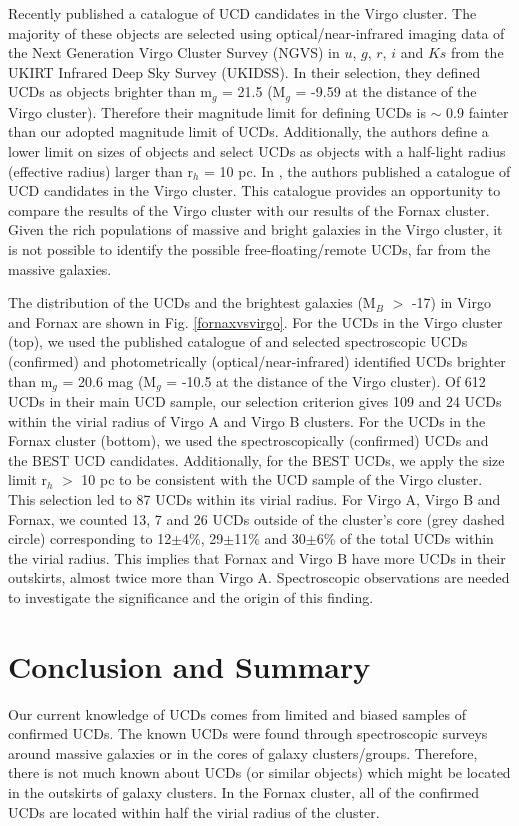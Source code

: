 \documentclass[fleqn,usenatbib]{mnras}
\begin{document}
Recently \citet{Liu-2020} published a catalogue of UCD candidates in the Virgo cluster. The majority of these objects are selected using optical/near-infrared imaging data of the Next Generation Virgo Cluster Survey (NGVS) in $u$, $g$, $r$, $i$ and $Ks$ from the UKIRT Infrared Deep Sky Survey (UKIDSS). In their selection, they defined UCDs as objects brighter than m$_g$ = 21.5 (M$_g$ = -9.59 at the distance of the Virgo cluster). Therefore their magnitude limit for defining UCDs is $\sim$ 0.9 fainter than our adopted magnitude limit of UCDs. Additionally, the authors define a lower limit on sizes of objects and select UCDs as objects with a half-light radius (effective radius) larger than r$_h$ = 10 pc. In \citet{Liu-2020}, the authors published a catalogue of UCD candidates in the Virgo cluster. This catalogue provides an opportunity to compare the results of the Virgo cluster with our results of the Fornax cluster. Given the rich populations of massive and bright galaxies in the Virgo cluster, it is not possible to identify the possible free-floating/remote UCDs, far from the massive galaxies.

The distribution of the UCDs and the brightest galaxies (M$_B$ $>$ -17) in Virgo and Fornax are shown in Fig. \ref{fornaxvsvirgo}. For the UCDs in the Virgo cluster (top), we used the published catalogue of \citet{Liu-2020} and selected spectroscopic UCDs (confirmed) and photometrically (optical/near-infrared) identified UCDs brighter than m$_g$ = 20.6 mag (M$_g$ = -10.5 at the distance of the Virgo cluster). Of 612 UCDs in their main UCD sample, our selection criterion gives 109 and 24 UCDs within the virial radius of Virgo A and Virgo B clusters. For the UCDs in the Fornax cluster (bottom), we used the spectroscopically (confirmed) UCDs and the BEST UCD candidates. Additionally, for the BEST UCDs, we apply the size limit r$_h$ $>$ 10 pc to be consistent with the UCD sample of the Virgo cluster. This selection led to 87 UCDs within its virial radius. For Virgo A, Virgo B and Fornax, we counted 13, 7 and 26 UCDs outside of the cluster's core (grey dashed circle) corresponding to 12$\pm$4\%, 29$\pm$11\% and 30$\pm$6\% of the total UCDs within the virial radius. This implies that Fornax and Virgo B have more UCDs in their outskirts, almost twice more than Virgo A. Spectroscopic observations are needed to investigate the significance and the origin of this finding.

\section{Conclusion and Summary}
\label{sec7}
Our current knowledge of UCDs comes from limited and biased samples of confirmed UCDs. The known UCDs were found through spectroscopic surveys around massive galaxies or in the cores of galaxy clusters/groups. Therefore, there is not much known about UCDs (or similar objects) which might be located in the outskirts of galaxy clusters. In the Fornax cluster, all of the confirmed UCDs are located within half the virial radius of the cluster.
\end{document}
